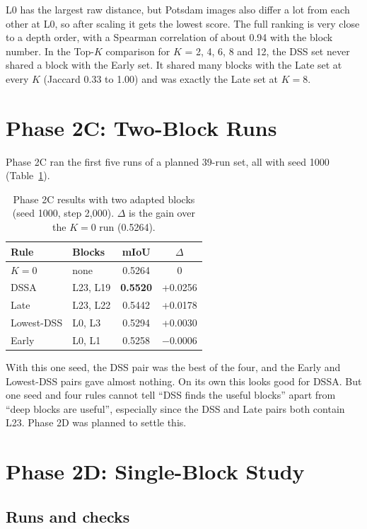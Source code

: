 \documentclass[11pt,a4paper]{report}
\begin{document}
L0 has the largest raw distance, but Potsdam images also differ a lot from each other at L0, so after scaling it gets the lowest score. The full ranking is very close to a depth order, with a Spearman correlation of about 0.94 with the block number. In the Top-$K$ comparison for $K$ = 2, 4, 6, 8 and 12, the DSS set never shared a block with the Early set. It shared many blocks with the Late set at every $K$ (Jaccard 0.33 to 1.00) and was exactly the Late set at $K = 8$.

\section{Phase 2C: Two-Block Runs}

Phase 2C ran the first five runs of a planned 39-run set, all with seed 1000 (Table~\ref{tab:k2}).

\begin{table}[t]
\centering
\caption{Phase 2C results with two adapted blocks (seed 1000, step 2,000). $\Delta$ is the gain over the $K = 0$ run (0.5264).}
\label{tab:k2}
\small
\begin{tabular}{@{}llcc@{}}
\toprule
\textbf{Rule} & \textbf{Blocks} & \textbf{mIoU} & \textbf{$\Delta$} \\
\midrule
$K = 0$ & none & 0.5264 & 0 \\
DSSA & L23, L19 & \textbf{0.5520} & +0.0256 \\
Late & L23, L22 & 0.5442 & +0.0178 \\
Lowest-DSS & L0, L3 & 0.5294 & +0.0030 \\
Early & L0, L1 & 0.5258 & $-0.0006$ \\
\bottomrule
\end{tabular}
\end{table}

With this one seed, the DSS pair was the best of the four, and the Early and Lowest-DSS pairs gave almost nothing. On its own this looks good for DSSA. But one seed and four rules cannot tell ``DSS finds the useful blocks'' apart from ``deep blocks are useful'', especially since the DSS and Late pairs both contain L23. Phase 2D was planned to settle this.

\section{Phase 2D: Single-Block Study}
\label{sec:p2d}

\subsection{Runs and checks}
\end{document}
